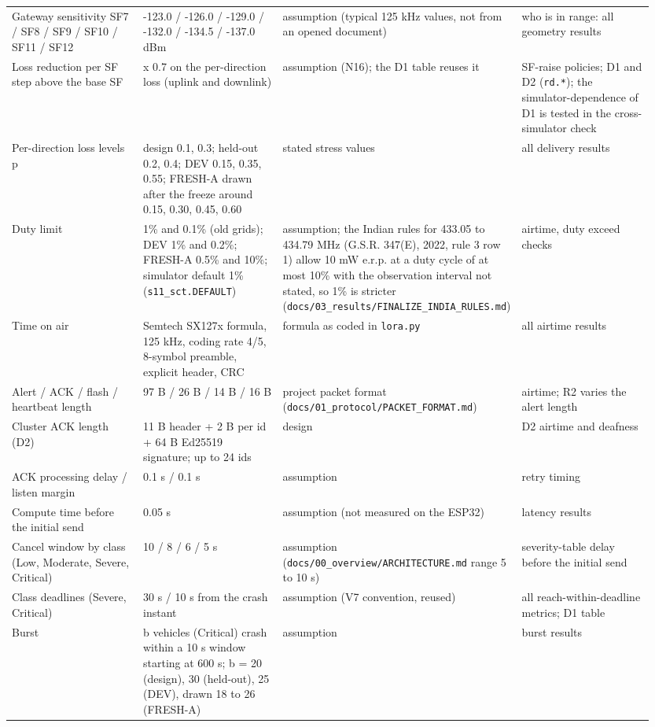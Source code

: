 {\begin{longtable}{p{0.237\linewidth}p{0.237\linewidth}p{0.237\linewidth}p{0.237\linewidth}}
Gateway sensitivity SF7 / SF8 / SF9 / SF10 / SF11 / SF12 & -123.0 / -126.0 / -129.0 / -132.0 / -134.5 / -137.0 dBm & assumption (typical 125 kHz values, not from an opened document) & who is in range: all geometry results \\
Loss reduction per SF step above the base SF & x 0.7 on the per-direction loss (uplink and downlink) & assumption (N16); the D1 table reuses it & SF-raise policies; D1 and D2 (\texttt{rd.*}); the simulator-dependence of D1 is tested in the cross-simulator check \\
Per-direction loss levels p & design 0.1, 0.3; held-out 0.2, 0.4; DEV 0.15, 0.35, 0.55; FRESH-A drawn after the freeze around 0.15, 0.30, 0.45, 0.60 & stated stress values & all delivery results \\
Duty limit & 1\% and 0.1\% (old grids); DEV 1\% and 0.2\%; FRESH-A 0.5\% and 10\%; simulator default 1\% (\texttt{s11\_sct.DEFAULT}) & assumption; the Indian rules for 433.05 to 434.79 MHz (G.S.R. 347(E), 2022, rule 3 row 1) allow 10 mW e.r.p. at a duty cycle of at most 10\% with the observation interval not stated, so 1\% is stricter (\texttt{docs/03\_results/FINALIZE\_INDIA\_RULES.md}) & airtime, duty exceed checks \\
Time on air & Semtech SX127x formula, 125 kHz, coding rate 4/5, 8-symbol preamble, explicit header, CRC & formula as coded in \texttt{lora.py} & all airtime results \\
Alert / ACK / flash / heartbeat length & 97 B / 26 B / 14 B / 16 B & project packet format (\texttt{docs/01\_protocol/PACKET\_FORMAT.md}) & airtime; R2 varies the alert length \\
Cluster ACK length (D2) & 11 B header + 2 B per id + 64 B Ed25519 signature; up to 24 ids & design & D2 airtime and deafness \\
ACK processing delay / listen margin & 0.1 s / 0.1 s & assumption & retry timing \\
Compute time before the initial send & 0.05 s & assumption (not measured on the ESP32) & latency results \\
Cancel window by class (Low, Moderate, Severe, Critical) & 10 / 8 / 6 / 5 s & assumption (\texttt{docs/00\_overview/ARCHITECTURE.md} range 5 to 10 s) & severity-table delay before the initial send \\
Class deadlines (Severe, Critical) & 30 s / 10 s from the crash instant & assumption (V7 convention, reused) & all reach-within-deadline metrics; D1 table \\
Burst & b vehicles (Critical) crash within a 10 s window starting at 600 s; b = 20 (design), 30 (held-out), 25 (DEV), drawn 18 to 26 (FRESH-A) & assumption & burst results \\

\end{longtable}}
